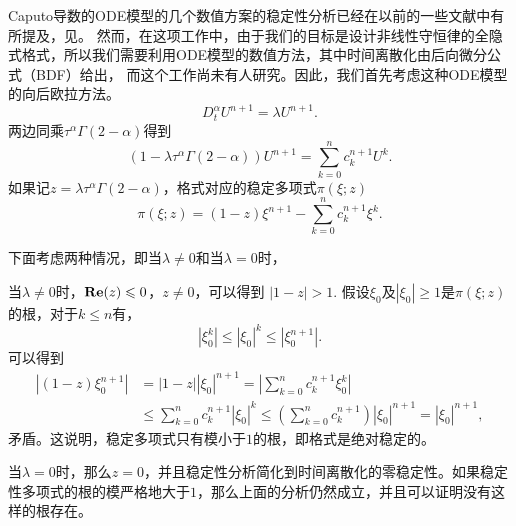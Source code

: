 Caputo导数的ODE模型的几个数值方案的稳定性分析已经在以前的一些文献中有所提及，见。 然而，在这项工作中，由于我们的目标是设计非线性守恒律的全隐式格式，所以我们需要利用ODE模型的数值方法，其中时间离散化由后向微分公式（BDF）给出， 而这个工作尚未有人研究。因此，我们首先考虑这种ODE模型的向后欧拉方法。
\begin{equation}\label{backE}
D_t^\alpha U^{n+1}=\lambda U^{n+1}.
\end{equation}
两边同乘$\tau^{\alpha}\Gamma (2-\alpha)$得到
\[
\left(1-\lambda\tau^\alpha\Gamma(2-\alpha) \right)U^{n+1} = \sum_{k=0}^{n} c_k^{n+1} U^{k}.
\]
如果记$z=\lambda\tau^\alpha\Gamma (2-\alpha)$，格式对应的稳定多项式$\pi(\xi;z)$
\[
\pi(\xi;z)=\left(1-z \right)\xi^{n+1} - \sum_{k=0}^{n} c^{n+1}_k \xi^{k}.
\]

下面考虑两种情况，即当$\lambda \ne 0$和当$\lambda=0$时，

当$\lambda \ne 0$时，${\bf Re} (z) \le 0$，$z\ne 0$，可以得到
$|1-z|>1$.
假设$\xi_0$及$|\xi_0|\ge1$是$\pi(\xi;z)$的根，对于$k\le n$有，
\[
|\xi_0^k| \le |\xi_0|^k \le |\xi_0^{n+1}|.
\]
可以得到
\begin{align*}
|(1-z)\xi_0^{n+1}|& = |1-z||\xi_0|^{n+1 }=|\sum_{k=0}^n c^{n+1}_k \xi_0^k| \\
& \le \sum_{k=0}^n c^{n+1}_k |\xi_0|^k  \le \left( \sum_{k=0}^n c^{n+1}_k \right) |\xi_0|^{n+1}=|\xi_0|^{n+1},
\end{align*}
矛盾。这说明，稳定多项式只有模小于$1$的根，即格式是绝对稳定的。

当$\lambda=0$时，那么$z = 0$，并且稳定性分析简化到时间离散化的零稳定性。如果稳定性多项式的根的模严格地大于$1$，那么上面的分析仍然成立，并且可以证明没有这样的根存在。

